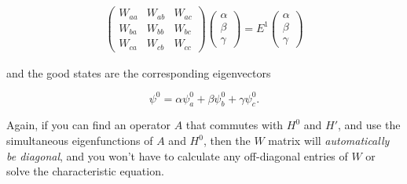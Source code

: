 \documentclass[svgnames]{article}     %
\begin{document}
\begin{align} \label{}
  \begin{pmatrix}
    W_{aa} & W_{ab} & W_{ac} \\ 
    W_{ba} & W_{bb} & W_{bc} \\ 
    W_{ca} & W_{cb} & W_{cc} 
  \end{pmatrix} \begin{pmatrix}
    \alpha \\ \beta \\ \gamma
  \end{pmatrix}  = E^{1} \begin{pmatrix}
    \alpha \\ \beta \\ \gamma
  \end{pmatrix} 
\end{align}\vspace{3px}

\noindent 

and the good states are the corresponding eigenvectors 

\[
\psi^{0} = \alpha \psi_a^{0} + \beta \psi_b^{0} + \gamma \psi_c^{0}. 
\] \vspace{3px}


Again, if you can find an operator $A$ that commutes with $H^{0}$ and $H'$, and
use the simultaneous eigenfunctions of $A$ and $H^{0}$, then the $W$ matrix
will \textit{automatically be diagonal}, and you won't have to calculate any
off-diagonal entries of $W$ or solve the characteristic equation. 
\end{document}
